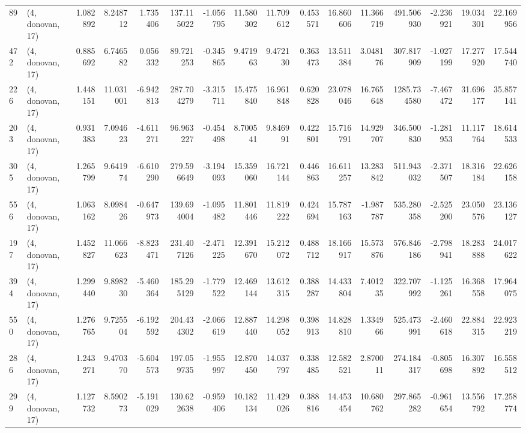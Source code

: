\begin{tabular}{llrrrrrrrrrrrrrr}
89  &  (4, donovan, 17) &   1.082892 &   8.248712 &   1.735406 &   137.115022 &  -1.056795 &  11.580302 &  11.709612 &  0.453571 &  16.860606 &  11.366719 &    491.506930 &  -2.236921 &   19.034301 &   22.169956 \\
472 &  (4, donovan, 17) &   0.885692 &   6.746582 &   0.056332 &    89.721253 &  -0.345865 &   9.471963 &   9.472130 &  0.363473 &  13.511384 &   3.048176 &    307.817909 &  -1.027199 &   17.277920 &   17.544740 \\
226 &  (4, donovan, 17) &   1.448151 &  11.031001 &  -6.942813 &   287.704279 &  -3.315711 &  15.475840 &  16.961848 &  0.620828 &  23.078046 &  16.765648 &   1285.734580 &  -7.467472 &   31.696177 &   35.857141 \\
203 &  (4, donovan, 17) &   0.931383 &   7.094623 &  -4.611271 &    96.963227 &  -0.454498 &   8.700541 &   9.846991 &  0.422801 &  15.716791 &  14.929707 &    346.500830 &  -1.281953 &   11.117764 &   18.614533 \\
305 &  (4, donovan, 17) &   1.265799 &   9.641974 &  -6.610290 &   279.596649 &  -3.194093 &  15.359060 &  16.721144 &  0.446863 &  16.611257 &  13.283842 &    511.943032 &  -2.371507 &   18.316184 &   22.626158 \\
556 &  (4, donovan, 17) &   1.063162 &   8.098426 &  -0.647973 &   139.694004 &  -1.095482 &  11.801446 &  11.819222 &  0.424694 &  15.787163 &  -1.987787 &    535.280358 &  -2.525200 &   23.050576 &   23.136127 \\
197 &  (4, donovan, 17) &   1.452827 &  11.066623 &  -8.823471 &   231.407126 &  -2.471225 &  12.391670 &  15.212072 &  0.488712 &  18.166917 &  15.573876 &    576.846186 &  -2.798941 &   18.283888 &   24.017622 \\
394 &  (4, donovan, 17) &   1.299440 &   9.898230 &  -5.460364 &   185.295129 &  -1.779522 &  12.469144 &  13.612315 &  0.388287 &  14.433804 &   7.401235 &    322.707992 &  -1.125261 &   16.368558 &   17.964075 \\
550 &  (4, donovan, 17) &   1.276765 &   9.725504 &  -6.192592 &   204.434302 &  -2.066619 &  12.887440 &  14.298052 &  0.398913 &  14.828810 &   1.334966 &    525.473991 &  -2.460618 &   22.884315 &   22.923219 \\
286 &  (4, donovan, 17) &   1.243271 &   9.470370 &  -5.604573 &   197.059735 &  -1.955997 &  12.870450 &  14.037797 &  0.338485 &  12.582521 &   2.870011 &    274.184317 &  -0.805698 &   16.307892 &   16.558512 \\
299 &  (4, donovan, 17) &   1.127732 &   8.590273 &  -5.191029 &   130.622638 &  -0.959406 &  10.182134 &  11.429026 &  0.388816 &  14.453454 &  10.680762 &    297.865282 &  -0.961654 &   13.556792 &   17.258774 \\

\end{tabular}
